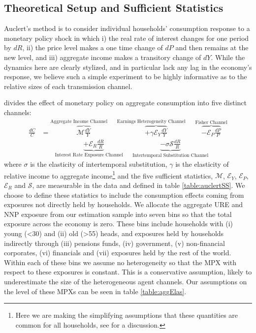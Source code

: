 \documentclass[titlepage]{\econtex}\newcommand{\texname}{ConsumptionHeterogeneity}
\begin{document}
\subsection{Theoretical Setup and Sufficient Statistics}
Auclert's method is to consider individual households' consumption response to a monetary policy shock in which i) the real rate of interest changes for one period by $dR$, ii) the price level makes a one time change of $dP$ and then remains at the new level, and iii) aggregate income makes a transitory change of $dY$. While the dynamics here are clearly stylized, and in particular lack any lag in the economy's response, we believe such a simple experiment to be highly informative as to the relative sizes of each transmission channel.

\cite{auclert_monetary_2017} divides the effect of monetary policy on aggregate consumption into five distinct channels:
\begingroup
\allowdisplaybreaks[0]
\begin{align} 
\frac{dC}{C} &= \overbrace{\mathcal{M}\frac{dY}{Y}}^{\text{Aggregate Income Channel}\qquad} \overbrace{ + \gamma \mathcal{E}_Y \frac{dY}{Y}}^{\text{Earnings Heterogeneity Channel}\qquad} \overbrace{ - \mathcal{E}_P\frac{dP}{P}}^{\text{Fisher Channel}}  \nonumber \\
& \qquad \underbrace{ + \mathcal{E}_R \frac{dR}{R}}_{\text{Interest Rate Exposure Channel}\qquad}  \underbrace{ - \sigma \mathcal{S}\frac{dR}{R}}_{\text{Intertemporal Substitution Channel}} \label{auclert_channels}
\end{align}
\endgroup
where $\sigma$ is the elasticity of intertemporal substitution, $\gamma$ is the elasticity of relative income to aggregate income\footnote{Here we are making the simplifying assumptions that these quantities are common for all households, see \cite{auclert_monetary_2017} for a discussion.} and the five sufficient statistics, $\mathcal{M}$, $\mathcal{E}_Y$, $\mathcal{E}_P$, $\mathcal{E}_R$ and $\mathcal{S}$, are measurable in the data and defined in table \ref{table:auclertSS}. We choose to define these statistics to include the consumption effects coming from exposures not directly held by households. We allocate the aggregate URE and NNP exposure from our estimation sample into seven bins so that the total exposure across the economy is zero. These bins include households with (i) young (<30) and (ii) old (>55) heads, and exposures held by households indirectly through (iii) pensions funds, (iv) government, (v) non-financial corporates, (vi) financials and (vii) exposures held by the rest of the world. Within each of these bins we assume no heterogeneity so that the MPX with respect to these exposures is constant. This is a conservative assumption, likely to underestimate the size of the heterogeneous agent channels. Our assumptions on the level of these MPXs can be seen in table \ref{table:aggElas}.
\end{document}
